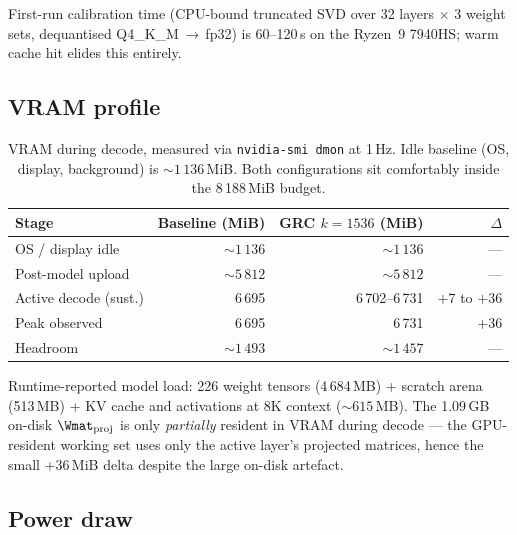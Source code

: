 \documentclass[11pt]{article}
\begin{document}
First-run calibration time (CPU-bound truncated SVD over 32 layers $\times$
3 weight sets, dequantised Q4\_K\_M\,$\to$\,fp32) is 60--120\,s on the
Ryzen~9 7940HS; warm cache hit elides this entirely.

\subsection{VRAM profile}

\begin{table}[h]\centering\footnotesize
\caption{VRAM during decode, measured via \texttt{nvidia-smi dmon} at 1\,Hz.
Idle baseline (OS, display, background) is ${\sim}1\,136$\,MiB. Both
configurations sit comfortably inside the 8\,188\,MiB budget.}
\begin{tabular}{@{}lrrr@{}}
\toprule
\textbf{Stage} & \textbf{Baseline (MiB)} & \textbf{GRC $k{=}1536$ (MiB)} & $\Delta$ \\
\midrule
OS / display idle      & ${\sim}1\,136$        & ${\sim}1\,136$        & ---\\
Post-model upload      & ${\sim}5\,812$        & ${\sim}5\,812$        & ---\\
Active decode (sust.)  & 6\,695                & 6\,702--6\,731        & $+7$ to $+36$\\
Peak observed          & 6\,695                & 6\,731                & $+36$\\
Headroom               & ${\sim}1\,493$        & ${\sim}1\,457$        & ---\\
\bottomrule
\end{tabular}
\end{table}

Runtime-reported model load: 226 weight tensors (4\,684\,MB) +
scratch arena (513\,MB) + KV cache and activations at 8K context
(${\sim}615$\,MB). The 1.09\,GB on-disk $\Wmat_\text{proj}$ is only
\emph{partially} resident in VRAM during decode --- the GPU-resident working
set uses only the active layer's projected matrices, hence the small +36\,MiB
delta despite the large on-disk artefact.

\subsection{Power draw}
\end{document}
